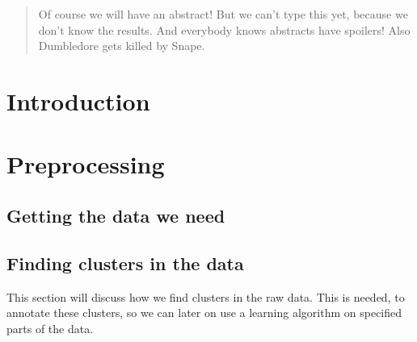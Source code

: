 \documentclass[a4paper, 11pt]{article}
\begin{document}

\vspace*{00mm}
\tableofcontents
\newpage






\begin{abstract}
Of course we will have an abstract! But we can't type this yet, because we don't
know the results. And everybody knows abstracts have spoilers! Also Dumbledore
gets killed by Snape.
\end{abstract}
\section{Introduction}

\section{Preprocessing}
 \subsection{Getting the data we need}
 
 \subsection{Finding clusters in the data}
 This section will discuss how we find clusters in the raw data. 
 This is needed, to annotate these clusters, so we can later on use a
 learning algorithm on specified parts of the data.
\end{document}
